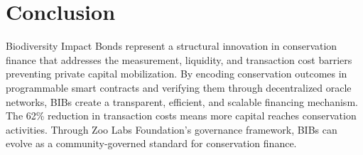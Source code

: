 \section{Conclusion}

\label{sec:conclusion}

Biodiversity Impact Bonds represent a structural innovation in
conservation finance that addresses the measurement, liquidity, and
transaction cost barriers preventing private capital mobilization. By
encoding conservation outcomes in programmable smart contracts and
verifying them through decentralized oracle networks, BIBs create a
transparent, efficient, and scalable financing mechanism. The 62\%
reduction in transaction costs means more capital reaches conservation
activities. Through Zoo Labs Foundation's governance framework, BIBs
can evolve as a community-governed standard for conservation finance.




